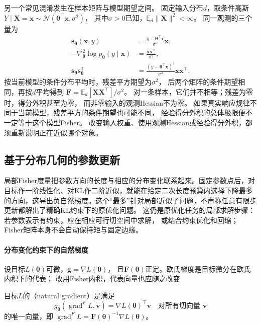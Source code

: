 另一个常见混淆发生在样本矩阵与模型期望之间。
固定输入分布\(d\)，取条件高斯
\(Y\mid\bm X=\bm x\sim\mathcal N(\bm\theta^\top\bm x,\sigma^2)\)，
其中\(\sigma>0\)已知，\(\mathbb E_d\|\bm X\|^2<\infty\)。
同一观测的三个量为
\[
\begin{aligned}
  \bm s_{\bm\theta}(\bm x,y)
    &=\frac{y-\bm\theta^\top\bm x}{\sigma^2}\bm x,\\
  -\nabla^2_{\bm\theta}\log p_{\bm\theta}(y\mid\bm x)
    &=\frac{\bm x\bm x^\top}{\sigma^2},\\
  \bm s_{\bm\theta}\bm s_{\bm\theta}^\top
    &=\frac{(y-\bm\theta^\top\bm x)^2}{\sigma^4}\bm x\bm x^\top.
\end{aligned}
\]
按当前模型的条件分布平均时，残差平方期望为\(\sigma^2\)，
后两个矩阵的条件期望相同，再按\(d\)平均得到
\(\bm F=\mathbb E_d[\bm X\bm X^\top]/\sigma^2\)。
对一条样本，它们并不相等；残差为零时，得分外积甚至为零，
而非零输入的观测Hessian不为零。
如果真实响应规律不同于当前模型，残差平方的条件期望也可能不同，
经验得分外积的总体极限便不一定等于这个模型Fisher。
改变输入权重、使用观测Hessian或经验得分外积，都须重新说明正在近似哪个对象。

\subsection{基于分布几何的参数更新}
\label{sec:information-geometric-update}

局部Fisher度量把参数方向的长度与相应的分布变化联系起来。固定参数点后，对目标作一阶线性化、对KL作二阶近似，就能在给定二次长度预算内选择下降最多的方向，这导出负自然梯度。这个“最多”针对局部近似子问题，不声称任意有限步更新都解出了精确KL约束下的原优化问题。
这仍是原优化任务的局部求解步骤：若参数表示有约束，应在相应可行切空间中求解，
或结合约束优化和回缩；Fisher矩阵本身不会自动保持矩与固定边缘。

\paragraph{分布变化约束下的自然梯度}
\label{sec:information-natural-gradient-update}

设目标\(L(\bm\theta)\)可微，\(\bm g=\nabla L(\bm\theta)\)，
且\(\bm F(\bm\theta)\)正定。欧氏梯度是目标微分在欧氏内积下的代表；
改用Fisher内积，代表向量也应随之改变
\begin{definition}[自然梯度]
\label{def:information-natural-gradient}
目标\(L\)的（natural gradient）是满足
\[
  g_{\bm\theta}(\operatorname{grad}^{F}L,\bm v)
  =\nabla L(\bm\theta)^\top\bm v
  \quad\text{对所有切向量 }\bm v
\]
的唯一向量，即
\(\operatorname{grad}^{F}L=\bm F(\bm\theta)^{-1}\nabla L(\bm\theta)\)。
\end{definition}

